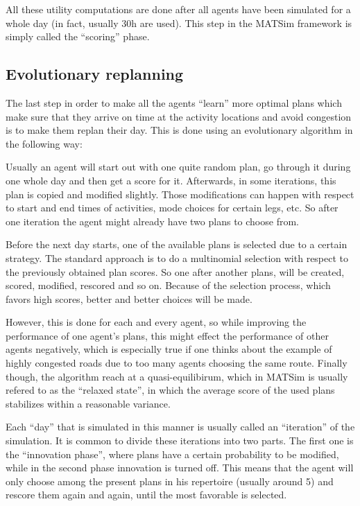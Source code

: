 
All these utility computations are done after all agents have been simulated for
a whole day (in fact, usually 30h are used). This step in the MATSim framework is
simply called the ``scoring'' phase.


\subsection{Evolutionary replanning}

The last step in order to make all the agents ``learn'' more optimal plans which
make sure that they arrive on time at the activity locations and avoid congestion
is to make them replan their day. This is done using an evolutionary algorithm in
the following way:

Usually an agent will start out with one quite random plan, go through it during
one whole day and then get a score for it. Afterwards, in some iterations, this
plan is copied and modified slightly. Those modifications can happen with respect
to start and end times of activities, mode choices for certain legs, etc. So after
one iteration the agent might already have two plans to choose from.

Before the next day starts, one of the available plans is selected due to a certain
strategy. The standard approach is to do a multinomial selection with respect to
the previously obtained plan scores. So one after another plans, will be created,
scored, modified, rescored and so on. Because of the selection process, which
favors high scores, better and better choices will be made.

However, this is done for each and every agent, so while improving the performance
of one agent's plans, this might effect the performance of other agents negatively,
which is especially true if one thinks about the example of highly congested roads
due to too many agents choosing the same route. Finally though, the algorithm reach
at a quasi-equilibirum, which in MATSim is usually refered to as the ``relaxed
state'', in which the average score of the used plans stabilizes within a
reasonable variance.

Each ``day'' that is simulated in this manner is usually called an ``iteration''
of the simulation. It is common to divide these iterations into two parts. The
first one is the ``innovation phase'', where plans have a certain probability to
be modified, while in the second phase innovation is turned off. This means that
the agent will only choose among the present plans in his repertoire (usually
around 5) and rescore them again and again, until the most favorable is selected.

